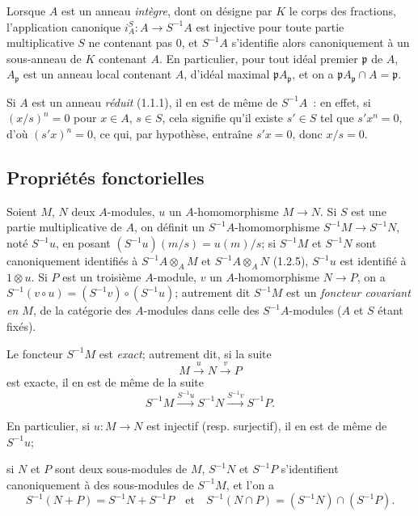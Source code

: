 \begin{env}[1.2.7]
\label{0.1.2.7-fr}
Lorsque $A$ est un anneau \emph{intègre}, dont on désigne par $K$ le corps des fractions, l'application canonique $i_A^S:A\to S^{-1}A$ est injective pour toute partie multiplicative $S$ ne contenant pas $0$, et $S^{-1}A$ s'identifie alors canoniquement à un sous-anneau de $K$ contenant $A$.
En particulier, pour tout idéal premier $\mathfrak{p}$ de $A$, $A_{\mathfrak{p}}$ est un anneau local contenant $A$, d'idéal maximal $\mathfrak{p}A_{\mathfrak{p}}$, et on a $\mathfrak{p}A_{\mathfrak{p}}\cap A=\mathfrak{p}$.
\end{env}

\begin{env}[1.2.8]
\label{0.1.2.8-fr}
Si $A$ est un anneau \emph{réduit} (1.1.1), il en est de même de $S^{-1}A$~: en effet, si $(x/s)^n=0$ pour $x\in A$, $s\in S$, cela signifie qu'il existe $s'\in S$ tel que $s'x^n=0$, d'où $(s'x)^n=0$, ce qui, par hypothèse, entraîne $s'x=0$, donc $x/s=0$.
\end{env}

\subsection{Propriétés fonctorielles}
\label{subsection:0.1.3-fr}

\begin{env}[1.3.1]
\label{0.1.3.1-fr}
Soient $M$, $N$ deux $A$-modules, $u$ un $A$-homomorphisme $M\to N$.
Si $S$ est une partie multiplicative de $A$, on définit un $S^{-1}A$-homomorphisme $S^{-1}M\to S^{-1}N$, noté $S^{-1}u$, en posant $(S^{-1}u)(m/s)=u(m)/s$; si $S^{-1}M$ et $S^{-1}N$ sont canoniquement identifiés à $S^{-1}A\otimes_A M$ et $S^{-1}A\otimes_A N$ (1.2.5), $S^{-1}u$ est identifié à $1\otimes u$.
Si $P$ est un troisième $A$-module, $v$ un $A$-homomorphisme $N\to P$, on a $S^{-1}(v\circ u)=(S^{-1}v)\circ(S^{-1}u)$; autrement dit $S^{-1}M$ est un \emph{foncteur covariant en $M$}, de la catégorie des $A$-modules dans celle des $S^{-1}A$-modules ($A$ et $S$ étant fixés).
\end{env}

\begin{env}[1.3.2]
\label{0.1.3.2-fr}
Le foncteur $S^{-1}M$ est \emph{exact}; autrement dit, si la suite
\[
  M\xrightarrow{u}N\xrightarrow{v}P
\]
est exacte, il en est de même de la suite
\[
  S^{-1}M\xrightarrow{S^{-1}u}S^{-1}N\xrightarrow{S^{-1}v}S^{-1}P.
\]

En particulier, si $u:M\to N$ est injectif (resp. surjectif), il en est de même de $S^{-1}u$;

si $N$ et $P$ sont deux sous-modules de $M$, $S^{-1}N$ et $S^{-1}P$ s'identifient canoniquement à des sous-modules de $S^{-1}M$, et l'on a
\[
  S^{-1}(N+P)=S^{-1}N+S^{-1}P
  \quad\text{et}\quad
  S^{-1}(N\cap P)=(S^{-1}N)\cap(S^{-1}P).
\]
\end{env}

